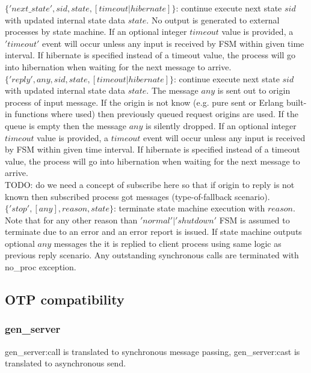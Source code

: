 \documentclass{report}
\begin{document}
	$\{'next\_state', sid, state, [timeout | hibernate]\}$:
	continue execute next state $sid$ with updated internal state data $state$. 
	No output is generated to external processes by state machine. If an optional
	integer $timeout$ value is provided, a $'timeout'$ event will occur unless 
	any input is received by FSM within given time interval. If hibernate is 
	specified instead of a timeout value, the process will go into hibernation when
	waiting for the next message to arrive.\\ 
		
	$\{'reply', any,  sid, state, [timeout | hibernate]\}$:
	continue execute next state $sid$ with updated internal state data $state$. 
	The message $any$ is sent out to origin process of input message. If the origin
	is not know (e.g. pure sent or Erlang built-in functions where used) then 
	previously queued request origins are used. If the queue 
	is empty then the message $any$ is silently dropped. If an optional integer
	$timeout$ value is provided, a $timeout$ event will occur unless any input
	is received by FSM within given time interval. If hibernate is 
	specified instead of a timeout value, the process will go into hibernation when
	waiting for the next message to arrive.\\ 

	TODO: do we need a concept of subscribe here so that if origin to reply is not 
	known then subscribed process got messages (type-of-fallback scenario). \\

	$\{'stop', [any], reason, state\}$:
	terminate state machine execution with $reason$. Note that for any other reason
	than $'normal' | 'shutdown'$ FSM is assumed to terminate due to an error and 
	an error report is issued. If state machine outputs optional $any$ messages
	the it is replied to client process using same logic as previous reply scenario.
	Any outstanding synchronous calls are terminated with no\_proc exception. 
	
\subsection{OTP compatibility}

\subsubsection{gen\_server}
	gen\_server:call is translated to synchronous message passing, gen\_server:cast 
	is translated to asynchronous send. 	
\end{document}
